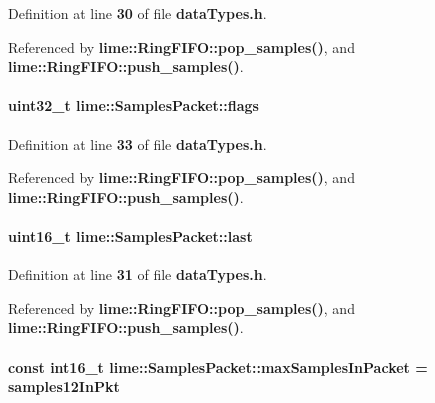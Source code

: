 Definition at line {\bf 30} of file {\bf data\+Types.\+h}.



Referenced by {\bf lime\+::\+Ring\+F\+I\+F\+O\+::pop\+\_\+samples()}, and {\bf lime\+::\+Ring\+F\+I\+F\+O\+::push\+\_\+samples()}.

\paragraph[{flags}]{\setlength{\rightskip}{0pt plus 5cm}uint32\+\_\+t lime\+::\+Samples\+Packet\+::flags}\label{classlime_1_1SamplesPacket_a0bc798bc95c2767260cfd04d85ef19a5}


Definition at line {\bf 33} of file {\bf data\+Types.\+h}.



Referenced by {\bf lime\+::\+Ring\+F\+I\+F\+O\+::pop\+\_\+samples()}, and {\bf lime\+::\+Ring\+F\+I\+F\+O\+::push\+\_\+samples()}.

\paragraph[{last}]{\setlength{\rightskip}{0pt plus 5cm}uint16\+\_\+t lime\+::\+Samples\+Packet\+::last}\label{classlime_1_1SamplesPacket_a813a9aa876fc3cb5f838bdad5b0ad204}


Definition at line {\bf 31} of file {\bf data\+Types.\+h}.



Referenced by {\bf lime\+::\+Ring\+F\+I\+F\+O\+::pop\+\_\+samples()}, and {\bf lime\+::\+Ring\+F\+I\+F\+O\+::push\+\_\+samples()}.

\paragraph[{max\+Samples\+In\+Packet}]{\setlength{\rightskip}{0pt plus 5cm}const int16\+\_\+t lime\+::\+Samples\+Packet\+::max\+Samples\+In\+Packet = {\bf samples12\+In\+Pkt}\hspace{0.3cm}{\ttfamily [static]}}\label{classlime_1_1SamplesPacket_adfe50bd26d1dd08f9ef90f666fd99ff0}


